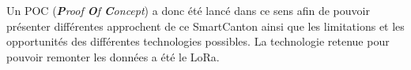 Un POC (\textit{\textbf{P}roof \textbf{O}f \textbf{C}oncept}) a donc été lancé dans ce sens afin de pouvoir présenter différentes approchent de ce SmartCanton ainsi que les limitations et les opportunités des différentes technologies possibles. La technologie retenue pour pouvoir remonter les données a été le LoRa. 


